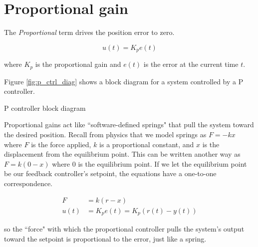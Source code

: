 \section{Proportional gain}

The \textit{Proportional} term drives the position error to zero.

\begin{definition}
  \begin{equation}
    u(t) = K_p e(t)
  \end{equation}

  where $K_p$ is the proportional gain and $e(t)$ is the error at the current
  time $t$.
\end{definition}

Figure \ref{fig:p_ctrl_diag} shows a block diagram for a \gls{system}
controlled by a P controller.

\begin{bookfigure}

  \caption{P controller block diagram}
  \label{fig:p_ctrl_diag}
\end{bookfigure}

Proportional gains act like ``software-defined springs" that pull the
\gls{system} toward the desired position. Recall from physics that we model
springs as $F = -kx$ where $F$ is the force applied, $k$ is a proportional
constant, and $x$ is the displacement from the equilibrium point. This can be
written another way as $F = k(0 - x)$ where $0$ is the equilibrium point.
If we let the equilibrium point be our feedback controller's \gls{setpoint}, the
equations have a one-to-one correspondence.

\begin{align*}
  F &= k(r - x) \\
  u(t) &= K_p e(t) = K_p(r(t) - y(t))
\end{align*}

so the ``force" with which the proportional controller pulls the \gls{system}'s
\gls{output} toward the \gls{setpoint} is proportional to the \gls{error}, just
like a spring.
